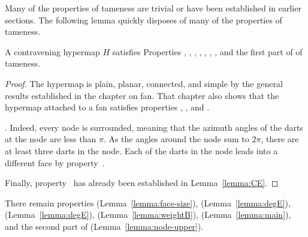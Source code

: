 Many of the properties of tameness are trivial or have been
established in earlier sections.  The following lemma quickly disposes
of many of the properties of tameness.

\begin{lemma}[]\label{lemma:multi}
  A contravening hypermap $H$ satisfies Properties ,
  , , , , , , and the first
  part of 
of tameness.
\end{lemma}

\begin{proof}
  The hypermap is plain, planar, connected, and simple by the general
  results established in the chapter on fan.  That chapter also shows
  that the hypermap attached to a fan satisfies properties
  , , and .

  .  Indeed, every node is
  surrounded, meaning that the azimuth angles of the darts at the
  node are less than $\pi$.  As the angles around the node sum to
  $2\pi$, there are at least three darts in the node. Each of the
  darts in the node leads into a different face by
  property~.

  Finally, property~ has already been established in
  Lemma~\ref{lemma:CE}.
\end{proof}

There remain properties 
(Lemma~\ref{lemma:face-size}), %
 (Lemma~\ref{lemma:degE}), 
(Lemma~\ref{lemma:degE}), 
(Lemma~\ref{lemma:weightB}), 
(Lemma~\ref{lemma:main}), and the second part of 
(Lemma~\ref{lemma:node-upper}).


